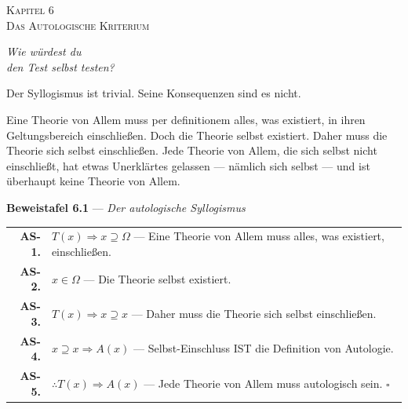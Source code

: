 \documentclass[10pt, openany, oneside]{book}
\renewcommand{\footnotesize}{\fontsize{8.5}{11}\selectfont}
\renewcommand{\large}{\fontsize{11.5}{14}\selectfont}
\renewcommand{\huge}{\fontsize{17}{21}\selectfont}
\begin{document}
\newpage

\begin{center}
    {\huge\scshape Kapitel 6}\\[0.3em]
    {\large\scshape Das Autologische Kriterium}
\end{center}

\vspace{1.5em}

\begin{center}
    \itshape
    Wie würdest du\\
    den Test selbst testen?
\end{center}

\vspace{2em}


\noindent Der Syllogismus ist trivial. Seine Konsequenzen sind es nicht.

Eine Theorie von Allem muss per definitionem alles, was existiert, in ihren Geltungsbereich einschließen. Doch die Theorie selbst existiert. Daher muss die Theorie sich selbst einschließen. Jede Theorie von Allem, die sich selbst nicht einschließt, hat etwas Unerklärtes gelassen --- nämlich sich selbst --- und ist überhaupt keine Theorie von Allem.

\vspace{0.5em}

\textbf{Beweistafel 6.1} --- \textit{Der autologische Syllogismus}

\vspace{0.5em}

{\footnotesize
\noindent\begin{tabular}{r p{}}
\textbf{AS-1.} & $T(x) \Rightarrow x \supseteq \Omega$ --- Eine Theorie von Allem muss alles, was existiert, einschließen. \\[0.3em]
\textbf{AS-2.} & $x \in \Omega$ --- Die Theorie selbst existiert. \\[0.3em]
\textbf{AS-3.} & $T(x) \Rightarrow x \supseteq x$ --- Daher muss die Theorie sich selbst einschließen. \\[0.3em]
\textbf{AS-4.} & $x \supseteq x \Rightarrow A(x)$ --- Selbst-Einschluss IST die Definition von Autologie. \\[0.3em]
\textbf{AS-5.} & $\therefore T(x) \Rightarrow A(x)$ --- Jede Theorie von Allem muss autologisch sein. $\square$ \\[0.3em]
\end{tabular}
}
\end{document}
